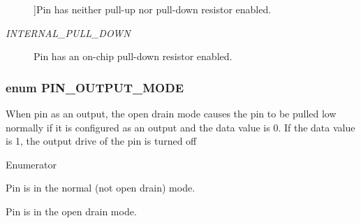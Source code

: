 \begin{Desc}
\begin{description}
{}]Pin has neither pull-\/up nor pull-\/down resistor enabled. \item[{\em 
\hypertarget{group___peripheral_gga16ce6180d8bb2eb23a7df8f8923ea581a1d483952a85ba6abceffda2c06623326}{I\-N\-T\-E\-R\-N\-A\-L\-\_\-\-P\-U\-L\-L\-\_\-\-D\-O\-W\-N}\label{group___peripheral_gga16ce6180d8bb2eb23a7df8f8923ea581a1d483952a85ba6abceffda2c06623326}
}]Pin has an on-\/chip pull-\/down resistor enabled. \end{description}
\end{Desc}
\hypertarget{group___peripheral_ga62483064e24f6949ab0a9b9234b4e549}{
\subsubsection[{P\-I\-N\-\_\-\-O\-U\-T\-P\-U\-T\-\_\-\-M\-O\-D\-E}]{\setlength{\rightskip}{0pt plus 5cm}enum {\bf P\-I\-N\-\_\-\-O\-U\-T\-P\-U\-T\-\_\-\-M\-O\-D\-E}}}\label{group___peripheral_ga62483064e24f6949ab0a9b9234b4e549}
When pin as an output, the open drain mode causes the pin to be pulled low normally if it is configured as an output and the data value is 0. If the data value is 1, the output drive of the pin is turned off \begin{Desc}
\item[Enumerator]\par
\begin{description}
\item[{\em 
\hypertarget{group___peripheral_gga62483064e24f6949ab0a9b9234b4e549afd68b1a66f2a33ce77d4f6c7f8fc998a}{N\-O\-T\-\_\-\-O\-P\-E\-N}\label{group___peripheral_gga62483064e24f6949ab0a9b9234b4e549afd68b1a66f2a33ce77d4f6c7f8fc998a}
}]Pin is in the normal (not open drain) mode. \item[{\em 
\hypertarget{group___peripheral_gga62483064e24f6949ab0a9b9234b4e549aa90b62c376675b218528e2b0b0a7f123}{O\-P\-E\-N\-\_\-\-D\-R\-A\-I\-N}\label{group___peripheral_gga62483064e24f6949ab0a9b9234b4e549aa90b62c376675b218528e2b0b0a7f123}
}]Pin is in the open drain mode. \end{description}
\end{Desc}
